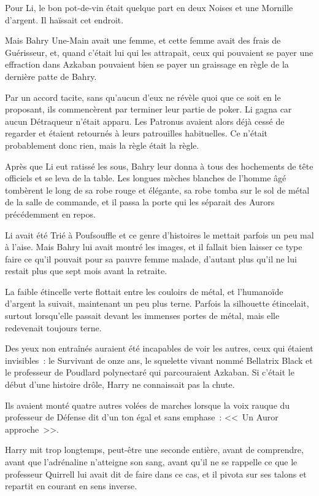 Pour Li, le bon pot-de-vin était quelque part en deux Noises et une Mornille d'argent. Il haïssait cet endroit.

Mais Bahry Une-Main avait une femme, et cette femme avait des frais de Guérisseur, et, quand c'était lui qui les attrapait, ceux qui pouvaient se payer une effraction dans Azkaban pouvaient bien se payer un graissage en règle de la dernière patte de Bahry.

Par un accord tacite, sans qu'aucun d'eux ne révèle quoi que ce soit en le proposant, ils commencèrent par terminer leur partie de poker. Li gagna car aucun Détraqueur n'était apparu. Les Patronus avaient alors déjà cessé de regarder et étaient retournés à leurs patrouilles habituelles. Ce n'était probablement donc rien, mais la règle était la règle.

Après que Li eut ratissé les sous, Bahry leur donna à tous des hochements de tête officiels et se leva de la table. Les longues mèches blanches de l'homme âgé tombèrent le long de sa robe rouge et élégante, sa robe tomba sur le sol de métal de la salle de commande, et il passa la porte qui les séparait des Aurors précédemment en repos.

Li avait été Trié à Poufsouffle et ce genre d'histoires le mettait parfois un peu mal à l'aise. Mais Bahry lui avait montré les images, et il fallait bien laisser ce type faire ce qu'il pouvait pour sa pauvre femme malade, d'autant plus qu'il ne lui restait plus que sept mois avant la retraite.

\later

La faible étincelle verte flottait entre les couloirs de métal, et l'humanoïde d'argent la suivait, maintenant un peu plus terne. Parfois la silhouette étincelait, surtout lorsqu'elle passait devant les immenses portes de métal, mais elle redevenait toujours terne.

Des yeux non entraînés auraient été incapables de voir les autres, ceux qui étaient invisibles~: le Survivant de onze ans, le squelette vivant nommé Bellatrix Black et le professeur de Poudlard polynectaré qui parcouraient Azkaban. Si c'était le début d'une histoire drôle, Harry ne connaissait pas la chute.

Ils avaient monté quatre autres volées de marches lorsque la voix rauque du professeur de Défense dit d'un ton égal et sans emphase~: <<~Un Auror approche~>>.

Harry mit trop longtemps, peut-être une seconde entière, avant de comprendre, avant que l'adrénaline n'atteigne son sang, avant qu'il ne se rappelle ce que le professeur Quirrell lui avait dit de faire dans ce cas, et il pivota sur ses talons et repartit en courant en sens inverse.

